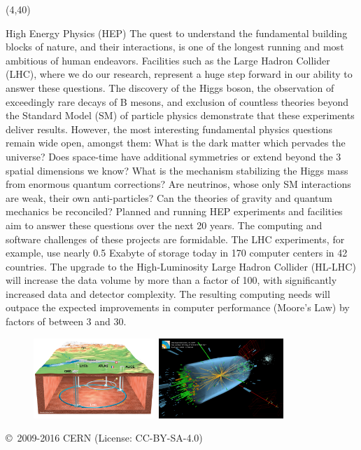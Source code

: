 \begin{textblock}{38.0}(4,40)
\begin{block}{High Energy Physics (HEP)}
The quest to understand the fundamental building blocks of nature,
and their interactions, is one of the longest running and most
ambitious of human endeavors. Facilities such as the Large Hadron
Collider (LHC), where we do our research, represent a huge step
forward in our ability to answer these questions. The discovery of
the Higgs boson, the observation of exceedingly rare decays of B
mesons, and exclusion of countless theories beyond the Standard
Model (SM) of particle physics demonstrate that these experiments
deliver results. However, the most interesting fundamental physics
questions remain wide open, amongst them: What is the dark matter
which pervades the universe? Does space-time have additional
symmetries or extend beyond the 3 spatial dimensions we know? What
is the mechanism stabilizing the Higgs mass from enormous quantum
corrections? Are neutrinos, whose only SM interactions are weak,
their own anti-particles? Can the theories of gravity and quantum
mechanics be reconciled? Planned and running HEP experiments 
and facilities aim to answer these questions over the next 20 years. 
The computing and software challenges of these projects are formidable. 
The LHC experiments, for example, use nearly 0.5 Exabyte of
storage today in 170 computer centers in 42 countries. 
The upgrade to the High-Luminosity Large Hadron Collider (HL-LHC) will
increase the data volume
by more than a factor of 100, with significantly increased data and detector complexity. The resulting computing needs will outpace the expected improvements in computer performance (Moore's Law) by factors of between 3 and 30. 

\begin{figure}[tbph]
\centering
\includegraphics[width=0.41\textwidth]{images/CERN-LHC-cutaway-view-medium.png}
\includegraphics[width=0.42\textwidth]{images/eemm_run195099_evt137440354_ispy_3d-annotated-2.png}
\end{figure}
{\small \copyright~2009-2016 CERN (License: CC-BY-SA-4.0)}
\end{block}
\end{textblock}
